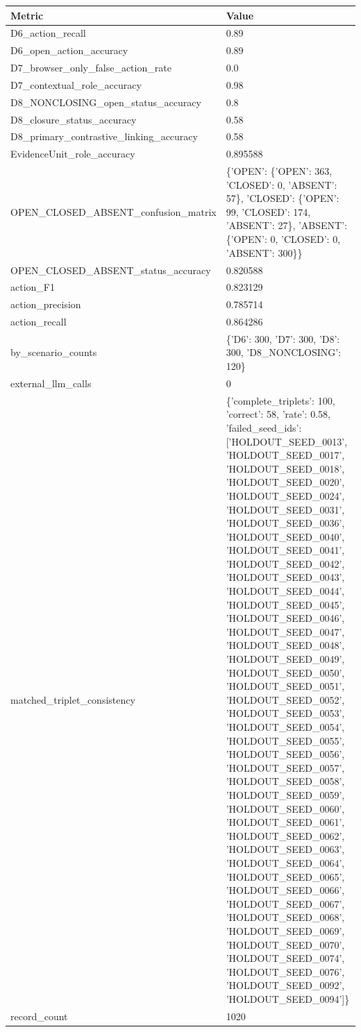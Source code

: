\begin{tabular}{ll}
\hline
Metric & Value \\
\hline
D6\_action\_recall & 0.89 \\
D6\_open\_action\_accuracy & 0.89 \\
D7\_browser\_only\_false\_action\_rate & 0.0 \\
D7\_contextual\_role\_accuracy & 0.98 \\
D8\_NONCLOSING\_open\_status\_accuracy & 0.8 \\
D8\_closure\_status\_accuracy & 0.58 \\
D8\_primary\_contrastive\_linking\_accuracy & 0.58 \\
EvidenceUnit\_role\_accuracy & 0.895588 \\
OPEN\_CLOSED\_ABSENT\_confusion\_matrix & \{'OPEN': \{'OPEN': 363, 'CLOSED': 0, 'ABSENT': 57\}, 'CLOSED': \{'OPEN': 99, 'CLOSED': 174, 'ABSENT': 27\}, 'ABSENT': \{'OPEN': 0, 'CLOSED': 0, 'ABSENT': 300\}\} \\
OPEN\_CLOSED\_ABSENT\_status\_accuracy & 0.820588 \\
action\_F1 & 0.823129 \\
action\_precision & 0.785714 \\
action\_recall & 0.864286 \\
by\_scenario\_counts & \{'D6': 300, 'D7': 300, 'D8': 300, 'D8\_NONCLOSING': 120\} \\
external\_llm\_calls & 0 \\
matched\_triplet\_consistency & \{'complete\_triplets': 100, 'correct': 58, 'rate': 0.58, 'failed\_seed\_ids': ['HOLDOUT\_SEED\_0013', 'HOLDOUT\_SEED\_0017', 'HOLDOUT\_SEED\_0018', 'HOLDOUT\_SEED\_0020', 'HOLDOUT\_SEED\_0024', 'HOLDOUT\_SEED\_0031', 'HOLDOUT\_SEED\_0036', 'HOLDOUT\_SEED\_0040', 'HOLDOUT\_SEED\_0041', 'HOLDOUT\_SEED\_0042', 'HOLDOUT\_SEED\_0043', 'HOLDOUT\_SEED\_0044', 'HOLDOUT\_SEED\_0045', 'HOLDOUT\_SEED\_0046', 'HOLDOUT\_SEED\_0047', 'HOLDOUT\_SEED\_0048', 'HOLDOUT\_SEED\_0049', 'HOLDOUT\_SEED\_0050', 'HOLDOUT\_SEED\_0051', 'HOLDOUT\_SEED\_0052', 'HOLDOUT\_SEED\_0053', 'HOLDOUT\_SEED\_0054', 'HOLDOUT\_SEED\_0055', 'HOLDOUT\_SEED\_0056', 'HOLDOUT\_SEED\_0057', 'HOLDOUT\_SEED\_0058', 'HOLDOUT\_SEED\_0059', 'HOLDOUT\_SEED\_0060', 'HOLDOUT\_SEED\_0061', 'HOLDOUT\_SEED\_0062', 'HOLDOUT\_SEED\_0063', 'HOLDOUT\_SEED\_0064', 'HOLDOUT\_SEED\_0065', 'HOLDOUT\_SEED\_0066', 'HOLDOUT\_SEED\_0067', 'HOLDOUT\_SEED\_0068', 'HOLDOUT\_SEED\_0069', 'HOLDOUT\_SEED\_0070', 'HOLDOUT\_SEED\_0074', 'HOLDOUT\_SEED\_0076', 'HOLDOUT\_SEED\_0092', 'HOLDOUT\_SEED\_0094']\} \\
record\_count & 1020 \\
\hline
\end{tabular}
